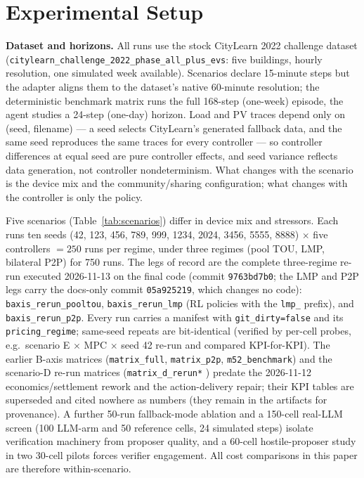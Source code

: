 \documentclass[11pt,a4paper]{article}
\begin{document}
\section{Experimental Setup}
\label{sec:setup}

\textbf{Dataset and horizons.} All runs use the stock CityLearn 2022 challenge
dataset (\texttt{citylearn\_challenge\_2022\_phase\_all\_plus\_evs}: five
buildings, hourly resolution, one simulated week available). Scenarios declare
15-minute steps but the adapter aligns them to the dataset's native 60-minute
resolution; the deterministic benchmark matrix runs the full 168-step
(one-week) episode, the agent studies a 24-step (one-day) horizon.
Load and PV traces depend only on (seed, filename) --- a seed selects CityLearn's generated
fallback data, and the same seed reproduces the same traces for every
controller --- so controller differences at equal seed are pure controller
effects, and seed variance reflects data generation, not controller
nondeterminism. What changes with the scenario is the device mix and the
community/sharing configuration; what changes with the controller is only the
policy.

Five scenarios (Table~\ref{tab:scenarios}) differ in device mix and stressors.
Each runs ten seeds (42, 123, 456, 789, 999, 1234, 2024, 3456, 5555,
8888) $\times$ five controllers $= 250$ runs per regime, under three regimes
(pool TOU, LMP, bilateral P2P) for 750 runs. The legs of record are the
complete three-regime re-run executed 2026-11-13 on the final code (commit
\texttt{9763bd7b0}; the LMP and P2P legs carry the docs-only commit
\texttt{05a925219}, which changes no code): \texttt{baxis\_rerun\_pooltou},
\texttt{baxis\_rerun\_lmp} (RL policies with the \texttt{lmp\_} prefix), and
\texttt{baxis\_rerun\_p2p}. Every run carries a manifest with
\texttt{git\_dirty=false} and its \texttt{pricing\_regime}; same-seed repeats
are bit-identical (verified by per-cell probes, e.g.\ scenario E $\times$ MPC
$\times$ seed 42 re-run and compared KPI-for-KPI). The
earlier B-axis matrices (\texttt{matrix\_full}, \texttt{matrix\_p2p},
\texttt{m52\_benchmark}) and the scenario-D re-run matrices
(\texttt{matrix\_d\_rerun*} ) predate the 2026-11-12 economics/settlement
rework and the action-delivery repair; their KPI tables are superseded and
cited nowhere as numbers (they remain in the artifacts for provenance). A
further 50-run fallback-mode
ablation and a 150-cell real-LLM screen (100 LLM-arm and 50 reference cells,
24 simulated steps) isolate verification machinery from proposer quality, and a
60-cell hostile-proposer study in two 30-cell pilots forces verifier
engagement. All cost comparisons in this paper are
therefore within-scenario.
\end{document}

